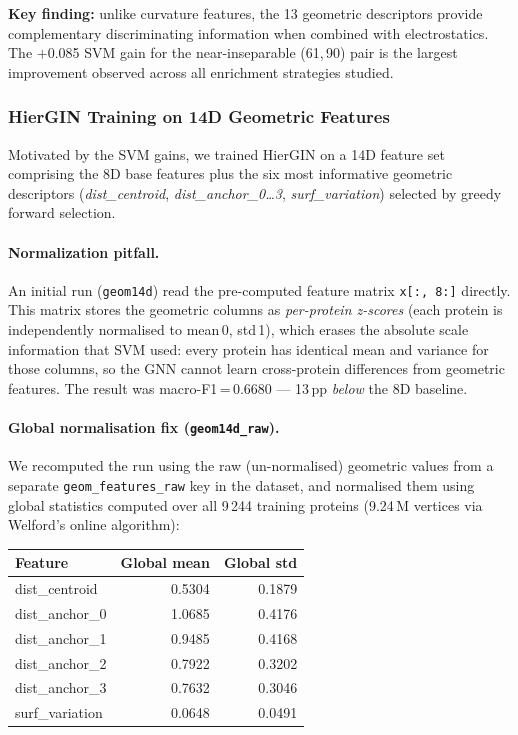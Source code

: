 \textbf{Key finding:} unlike curvature features, the 13 geometric descriptors
provide complementary discriminating information when combined with
electrostatics.
The $+$0.085 SVM gain for the near-inseparable (61,\,90) pair is the largest
improvement observed across all enrichment strategies studied.

\subsubsection{HierGIN Training on 14D Geometric Features}
\label{sec:analysis:geom:gnn}

Motivated by the SVM gains, we trained HierGIN on a 14D feature set comprising
the 8D base features plus the six most informative geometric descriptors
(\textit{dist\_centroid}, \textit{dist\_anchor\_0\ldots3},
\textit{surf\_variation}) selected by greedy forward selection.

\paragraph{Normalization pitfall.}
An initial run (\texttt{geom14d}) read the pre-computed feature matrix
\texttt{x[:, 8:]} directly.
This matrix stores the geometric columns as \textit{per-protein z-scores}
(each protein is independently normalised to mean\,0, std\,1), which erases
the absolute scale information that SVM used: every protein has identical
mean and variance for those columns, so the GNN cannot learn cross-protein
differences from geometric features.
The result was macro-F1\,=\,0.6680 --- 13\,pp \emph{below} the 8D baseline.

\paragraph{Global normalisation fix (\texttt{geom14d\_raw}).}
We recomputed the run using the raw (un-normalised) geometric values
from a separate \texttt{geom\_features\_raw} key in the dataset, and
normalised them using global statistics computed over all 9\,244 training
proteins (9.24\,M vertices via Welford's online algorithm):

\begin{center}
  \small
  \begin{tabular}{lrr}
    \toprule
    \textbf{Feature} & \textbf{Global mean} & \textbf{Global std} \\
    \midrule
    dist\_centroid   & 0.5304 & 0.1879 \\
    dist\_anchor\_0  & 1.0685 & 0.4176 \\
    dist\_anchor\_1  & 0.9485 & 0.4168 \\
    dist\_anchor\_2  & 0.7922 & 0.3202 \\
    dist\_anchor\_3  & 0.7632 & 0.3046 \\
    surf\_variation  & 0.0648 & 0.0491 \\
    \bottomrule
  \end{tabular}
\end{center}

